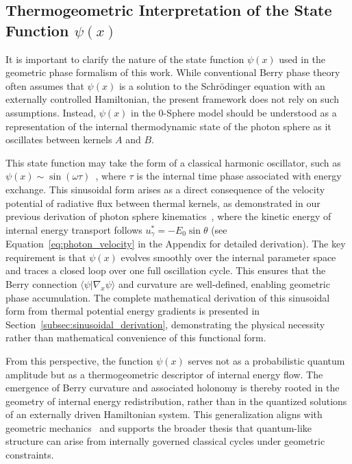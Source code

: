 \documentclass[%
 reprint,
 amsmath,amssymb,
 aps,
]{revtex4-1}
\numberwithin{equation}{section}%
\begin{document}
\clearpage

\subsection{Thermogeometric Interpretation of the State Function \texorpdfstring{$\psi(x)$}{}} \label{subsec:thermogeometric}  

It is important to clarify the nature of the state function $\psi(x)$ used in the geometric phase formalism of this work. While conventional Berry phase theory often assumes that $\psi(x)$ is a solution to the Schrödinger equation with an externally controlled Hamiltonian, the present framework does not rely on such assumptions. Instead, $\psi(x)$ in the 0-Sphere model should be understood as a representation of the internal thermodynamic state of the photon sphere as it oscillates between kernels $A$ and $B$. 

This state function may take the form of a classical harmonic oscillator, such as \( \psi(x) \sim \sin(\omega \tau) \)~\cite{hanamura1811.0312}, where \( \tau \) is the internal time phase associated with energy exchange. This sinusoidal form arises as a direct consequence of the velocity potential of radiative flux between thermal kernels, as demonstrated in our previous derivation of photon sphere kinematics~\cite{hanamura1811.0312}, where the kinetic energy of internal energy transport follows \( u_\gamma^* = -E_0 \sin \theta \) (see Equation~\eqref{eq:photon_velocity} in the Appendix for detailed derivation). The key requirement is that \( \psi(x) \) evolves smoothly over the internal parameter space and traces a closed loop over one full oscillation cycle. This ensures that the Berry connection \( \langle \psi | \nabla_x \psi \rangle \) and curvature are well-defined, enabling geometric phase accumulation. The complete mathematical derivation of this sinusoidal form from thermal potential energy gradients is presented in Section~\ref{subsec:sinusoidal_derivation}, demonstrating the physical necessity rather than mathematical convenience of this functional form.

From this perspective, the function $\psi(x)$ serves not as a probabilistic quantum amplitude but as a thermogeometric descriptor of internal energy flow. The emergence of Berry curvature and associated holonomy is thereby rooted in the geometry of internal energy redistribution, rather than in the quantized solutions of an externally driven Hamiltonian system. This generalization aligns with geometric mechanics~\cite{shapere1989geometric} and supports the broader thesis that quantum-like structure can arise from internally governed classical cycles under geometric constraints.
\end{document}
